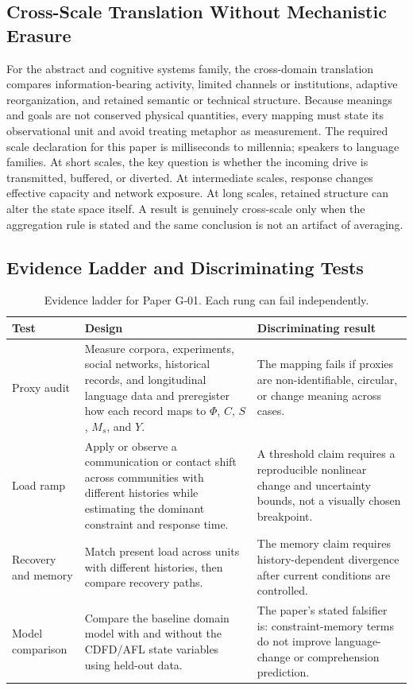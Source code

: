 \documentclass[11pt,a4paper]{article}
\begin{document}
\subsection{Cross-Scale Translation Without Mechanistic Erasure}

For the abstract and cognitive systems family, the cross-domain translation compares information-bearing activity, limited channels or institutions, adaptive reorganization, and retained semantic or technical structure. Because meanings and goals are not conserved physical quantities, every mapping must state its observational unit and avoid treating metaphor as measurement. \cite{Shannon1948,BarabasiAlbert1999,WattsStrogatz1998,Turing1952,BakTangWiesenfeld1987}
The required scale declaration for this paper is milliseconds to millennia; speakers to language families. At short
scales, the key question is whether the incoming drive is transmitted,
buffered, or diverted. At intermediate scales, response changes effective
capacity and network exposure. At long scales, retained structure can alter the
state space itself. A result is genuinely cross-scale only when the aggregation
rule is stated and the same conclusion is not an artifact of averaging.

\subsection{Evidence Ladder and Discriminating Tests}

\begin{table}[htbp]
\centering
\small
\caption{Evidence ladder for Paper G-01. Each rung can fail independently.}
\begin{tabularx}{\textwidth}{|p{}|X|X|}
\hline
\textbf{Test} & \textbf{Design} & \textbf{Discriminating result} \\
\hline
Proxy audit & Measure corpora, experiments, social networks, historical records, and longitudinal language data and preregister how each record maps to $\Phi$, $C$, $S$, $M_s$, and $Y$. & The mapping fails if proxies are non-identifiable, circular, or change meaning across cases. \\
\hline
Load ramp & Apply or observe a communication or contact shift across communities with different histories while estimating the dominant constraint and response time. & A threshold claim requires a reproducible nonlinear change and uncertainty bounds, not a visually chosen breakpoint. \\
\hline
Recovery and memory & Match present load across units with different histories, then compare recovery paths. & The memory claim requires history-dependent divergence after current conditions are controlled. \\
\hline
Model comparison & Compare the baseline domain model with and without the CDFD/AFL state variables using held-out data. & The paper's stated falsifier is: constraint-memory terms do not improve language-change or comprehension prediction. \\
\hline
\end{tabularx}
\end{table}
\end{document}
